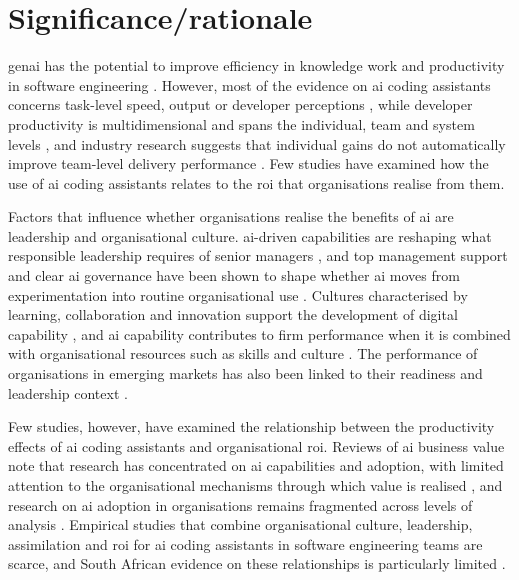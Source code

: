 \newpage
\section{Significance/rationale} 
\label{sec:Significance/rationale} 

\gls{genai} has the potential to improve efficiency in knowledge work and productivity in software engineering \parencite{Brynjolfsson2025, Peng2023, Cui2026}. However, most of the evidence on \gls{ai} coding assistants concerns task-level speed, output or developer perceptions \parencite{Peng2023, Ziegler2024, LiangJT2024, Sergeyuk2025}, while developer productivity is multidimensional and spans the individual, team and system levels \parencite{Forsgren2021}, and industry research suggests that individual gains do not automatically improve team-level delivery performance \parencite{Harvey2024}. Few studies have examined how the use of \gls{ai} coding assistants relates to the \gls{roi} that organisations realise from them.

Factors that influence whether organisations realise the benefits of \gls{ai} are leadership and organisational culture. \gls{ai}-driven capabilities are reshaping what responsible leadership requires of senior managers \parencite{Hossain2025}, and top management support and clear \gls{ai} governance have been shown to shape whether \gls{ai} moves from experimentation into routine organisational use \parencite{Johnk2021, Uren2023, DORA2025}. Cultures characterised by learning, collaboration and innovation support the development of digital capability \parencite{An2024, FossoWamba2024, Johnk2021}, and \gls{ai} capability contributes to firm performance when it is combined with organisational resources such as skills and culture \parencite{Mikalef2021}. The performance of organisations in emerging markets has also been linked to their readiness and leadership context \parencite{Gillespie2025, Isagah2024}.

Few studies, however, have examined the relationship between the productivity effects of \gls{ai} coding assistants and organisational \gls{roi}. Reviews of \gls{ai} business value note that research has concentrated on \gls{ai} capabilities and adoption, with limited attention to the organisational mechanisms through which value is realised \parencite{Enholm2022}, and research on \gls{ai} adoption in organisations remains fragmented across levels of analysis \parencite{Romeo2025}. Empirical studies that combine organisational culture, leadership, assimilation and \gls{roi} for \gls{ai} coding assistants in software engineering teams are scarce, and South African evidence on these relationships is particularly limited \parencite{Poisat2024, Smit2024, Muzuva2024}.

